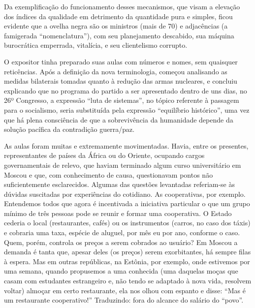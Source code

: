 Da exemplificação do funcionamento desses mecanismos, que visam a
elevação dos índices da qualidade em detrimento da quantidade pura e
simples, ficou evidente que a ovelha negra são os ministros (mais de 70)
e adjacências (a famigerada ``nomenclatura''), com seu planejamento
descabido, sua máquina burocrática emperrada, vitalícia, e seu
clientelismo corrupto.

O expositor tinha preparado suas aulas com números e nomes, sem
quaisquer reticências. Após a definição da nova terminologia, começou
analisando as medidas bilaterais tomadas quanto à redução das armas
nucleares, e concluiu explicando que no programa do partido a ser
apresentado dentro de uns dias, no 26º Congresso, a expressão ``luta de
sistemas'', no tópico referente à passagem para o socialismo, seria
substituída pela expressão ``equilíbrio histórico'', uma vez que há
plena consciência de que a sobrevivência da humanidade depende da
solução pacífica da contradição guerra/paz.

As aulas foram muitas e extremamente movimentadas. Havia, entre os
presentes, representantes de países da África ou do Oriente, ocupando
cargos governamentais de relevo, que haviam terminado algum curso
universitário em Moscou e que, com conhecimento de causa, questionavam
pontos não suficientemente esclarecidos. Algumas das questões levantadas
referiam-se às dúvidas suscitadas por experiências do cotidiano. As
cooperativas, por exemplo. Entendemos todos que agora é incentivada a
iniciativa particular o que um grupo mínimo de três pessoas pode se
reunir e formar uma cooperativa. O Estado cederia o local (restaurantes,
cafés) ou os instrumentos (carros, no caso dos táxis) e cobraria uma
taxa, espécie de aluguel, por mês eu por ano, conforme o caso. Quem,
porém, controla os preços a serem cobrados ao usuário? Em Moscou a
demanda é tanta que, apesar deles (os preços) serem exorbitantes, há
sempre filas à espera. Mas em outras repúblicas, na Estônia, por
exemplo, onde estivemos por uma semana, quando propusemos a uma
conhecida (uma daquelas moças que casam com estudantes estrangeiro e,
não tendo se adaptado à nova vida, resolvem voltar) almoçar em certo
restaurante, ela nos olhou com espanto e disse: ``Mas é um restaurante
cooperativo!'' Traduzindo: fora do alcance do salário do ``povo''.

